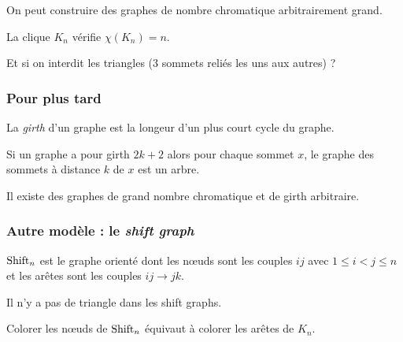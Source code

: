 On peut construire des graphes de nombre chromatique arbitrairement grand.

\begin{exemple}
	La clique $K_n$ vérifie $\chi(K_n) = n$.
\end{exemple}

Et si on interdit les triangles (3 sommets reliés les uns aux autres) ?

\begin{exemple}
\end{exemple}

\begin{exemple}[Mycielski]
\end{exemple}

\subsubsection{Pour plus tard}

\begin{definition}
	La \emph{girth} d'un graphe est la longeur d'un plus court cycle du graphe.
\end{definition}

\begin{note}
	Si un graphe a pour girth $2k + 2$ alors pour chaque sommet $x$, le graphe des sommets à distance $k$ de $x$ est un arbre.
\end{note}

\begin{theoreme}[Erdös]
	Il existe des graphes de grand nombre chromatique et de girth arbitraire.
\end{theoreme}

\subsubsection[Autre modèle : le shift graph]{Autre modèle : le \emph{shift graph}}

\begin{definition}
	$\operatorname{Shift}_n$ est le graphe orienté dont les nœuds sont les couples $i j$ avec $1 \le i < j \le n$ et les arêtes sont les couples $i j \to j k$.
\end{definition}

\begin{exemple}[$\shift_4$]
\end{exemple}

Il n'y a pas de triangle dans les shift graphs.

Colorer les nœuds de $\operatorname{Shift}_n$ équivaut à colorer les arêtes de $K_n$.

